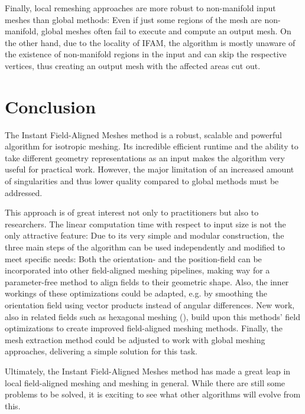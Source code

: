 \documentclass{ACGSeminar}
\begin{document}
Finally, local remeshing approaches are more robust to non-manifold input meshes than global methods: Even if just some regions of the mesh are non-manifold, global meshes often fail to execute and compute an output mesh. On the other hand, due to the locality of IFAM, the algorithm is mostly unaware of the existence of non-manifold regions in the input and can skip the respective vertices, thus creating an output mesh with the affected areas cut out.

\section{Conclusion}
The Instant Field-Aligned Meshes method is a robust, scalable and powerful algorithm for isotropic meshing. Its incredible efficient runtime and the ability to take different geometry representations as an input makes the algorithm very useful for practical work. However, the major limitation of an increased amount of singularities and thus lower quality compared to global methods must be addressed.\bigskip

This approach is of great interest not only to practitioners but also to researchers. The linear computation time with respect to input size is not the only attractive feature: Due to its very simple and modular construction, the three main steps of the algorithm can be used independently and modified to meet specific needs: Both the orientation- and the position-field can be incorporated into other field-aligned meshing pipelines, making way for a parameter-free method to align fields to their geometric shape. Also, the inner workings of these optimizations could be adapted, e.g. by smoothing the orientation field using vector products instead of angular differences. New work, also in related fields such as hexagonal meshing (\cite{gao2017robust}), build upon this methods' field optimizations to create improved field-aligned meshing methods. Finally, the mesh extraction method could be adjusted to work with global meshing approaches, delivering a simple solution for this task.\bigskip

Ultimately, the Instant Field-Aligned Meshes method has made a great leap in local field-aligned meshing and meshing in general. While there are still some problems to be solved, it is exciting to see what other algorithms will evolve from this.

\label{cha:references}
\printbibliography
\end{document}
